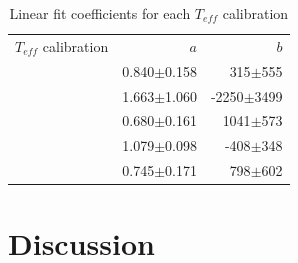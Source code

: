 \documentclass[referee]{aa}
\begin{document}
\begin{table}[]
\centering
\caption[]{Linear fit coefficients for each $T_{eff}$ calibration}
\label{table:fit_teff}
\begin{tabular}{l r r}
\hline
\hline
$T_{eff}$ calibration & $a$ & $b$ \\
\citet{Rojas-Ayala-2012}  &  0.840$\pm$0.158 & 315$\pm$555 \\
\citet{Onehag-2012} &  1.663$\pm$1.060 & -2250$\pm$3499 \\
\citet{Mann-2013b}  &  0.680$\pm$0.161 & 1041$\pm$573 \\
\citet{Boyajian-2012} &  1.079$\pm$0.098 & -408$\pm$348 \\
\citet{Rajpurohit-2013a}  &  0.745$\pm$0.171 & 798$\pm$602 \\
\hline
\end{tabular}
\end{table}









\section{Discussion}
\label{sec:discussion}
\end{document}
